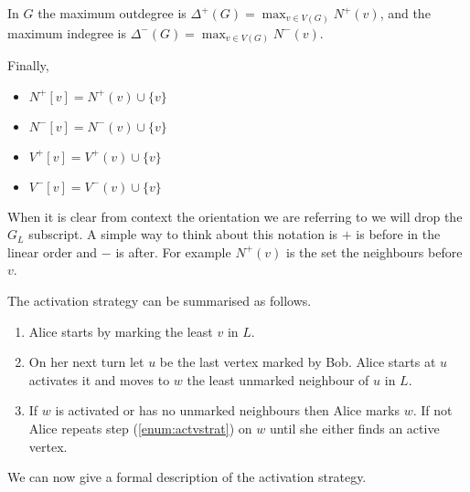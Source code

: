 In $G$ the maximum outdegree is $\Delta^+(G)=\max_{v\in V(G)}N^+(v)$, and 
the maximum indegree is $\Delta^-(G)=\max_{v\in V(G)}N^-(v)$. 

Finally,
\begin{itemize}  
    \item $N^+[v]=N^+(v)\cup\{v\}$
    \item $N^-[v]=N^-(v)\cup\{v\}$
    \item $V^+[v]=V^+(v)\cup\{v\}$
    \item $V^-[v]=V^-(v)\cup\{v\}$
\end{itemize}
When it is clear from context the orientation we are referring to we will drop the $G_L$ subscript.  A simple way to think about this notation is $+$ is before in the linear order and $-$ is after. For example $N^+(v)$ is the set the neighbours before $v$.

The activation strategy can be summarised as follows. 
\begin{enumerate}
    \item Alice starts by marking the least $v$ in $L$.
    \item On her next turn let $u$ be the last vertex marked by Bob. Alice starts at $u$ activates it and moves to $w$ the least unmarked neighbour of $u$ in $L$. \label{enum:actvstrat}
    \item If $w$ is activated or has no unmarked neighbours then Alice marks $w$. If not Alice repeats step (\ref{enum:actvstrat}) on $w$ until she either finds an active vertex.
\end{enumerate}


 We can now give a formal description of the activation strategy.

